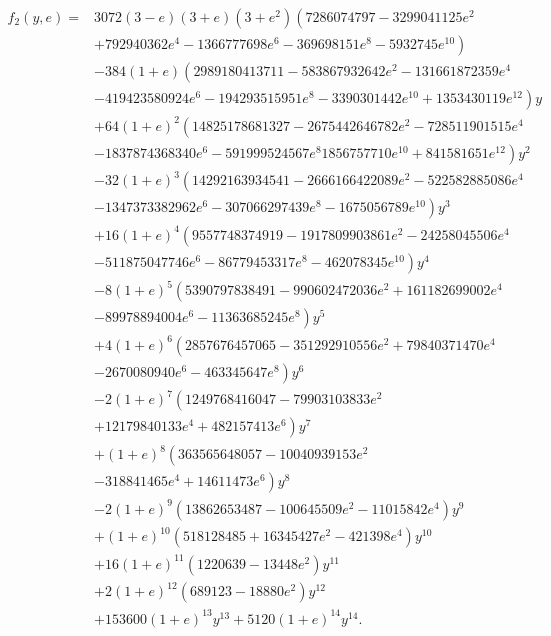 \begin{align}
f_2(y, e) = {} & 3072 (3 - e) (3 + e) \left(3 + e^2 \right) \left(7286074797 - 3299041125 e^2 \right. \nonumber \\
 {} & + \left. 792940362 e^4 - 1366777698 e^6 - 369698151 e^8 - 5932745 e^{10} \right) \nonumber \\
 {} & - \left. 384 (1 + e) \left(2989180413711 - 583867932642 e^2 - 131661872359 e^4 \right.\right. \nonumber \\
 {} & - \left. 419423580924 e^6 - 194293515951 e^8 - 3390301442 e^{10} + 1353430119 e^{12} \right) {y} \nonumber \\
 {} & + \left. 64 (1 + e)^2 \left(14825178681327 - 2675442646782 e^2 - 728511901515 e^4 \right.\right. \nonumber \\
 {} & - \left. 1837874368340 e^6 - 591999524567 e^8 1856757710 e^{10} + 841581651 e^{12}\right) y^2 \nonumber \\
 {} & - \left. 32 (1 + e)^3 \left(14292163934541 -2666166422089 e^2 - 522582885086 e^4 \right.\right. \nonumber \\
 {} & - \left. 1347373382962 e^6 - 307066297439 e^8 - 1675056789 e^{10}\right) y^3 \nonumber \\
 {} & + \left. 16 (1 + e)^4 \left(9557748374919 - 1917809903861 e^2 - 24258045506 e^4 \right.\right. \nonumber \\
 {} & - \left. 511875047746 e^6 - 86779453317 e^8 - 462078345 e^{10}\right) y^4 \nonumber \\
 {} & - \left. 8 (1 + e)^5 \left(5390797838491 - 990602472036 e^2 + 161182699002 e^4 \right.\right. \nonumber \\
 {} & - \left. 89978894004 e^6 - 11363685245 e^8\right) y^5 \nonumber \\
 {} & + \left. 4 (1 + e)^6 \left(2857676457065 - 351292910556 e^2 + 79840371470 e^4 \right.\right. \nonumber \\
 {} & - \left. 2670080940 e^6 - 463345647 e^8 \right) y^6 \nonumber \\
 {} & - \left. 2 (1 + e)^7 \left(1249768416047 - 79903103833 e^2 \right.\right. \nonumber \\
 {} & + \left. 12179840133 e^4 + 482157413 e^6\right) y^7 \nonumber \\
 {} & + \left. (1 + e)^8 \left(363565648057 - 10040939153 e^2 \right.\right. \nonumber \\
 {} & - \left. 318841465 e^4 + 14611473 e^6 \right) y^8 \nonumber \\
 {} & - \left. 2 (1 + e)^9 \left(13862653487 - 100645509 e^2 - 11015842 e^4\right) y^9 \right. \nonumber \\
 {} & + \left. (1 + e)^{10} \left(518128485 + 16345427 e^2 - 421398 e^4\right) y^{10} \right. \nonumber \\
 {} & + \left. 16 (1 + e)^{11} \left(1220639 - 13448 e^2 \right) y^{11} \right. \nonumber \\
 {} & + \left. 2 (1 + e)^{12} \left(689123 - 18880 e^2 \right) y^{12} \right. \nonumber \\
 {} & + \left. 153600 (1 + e)^{13} y^{13} + 5120 (1 + e)^{14} {y}^{14}. \right.
\end{align}
